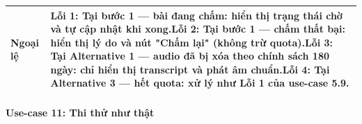 \begin{longtable}{|p{3.2cm}|p{\dimexpr\linewidth-3.2cm-4\tabcolsep-3\arrayrulewidth\relax}|}
\textbf{Ngoại lệ} & \textbf{Lỗi 1:} Tại bước 1 --- bài đang chấm: hiển thị trạng thái chờ và tự cập nhật khi xong.\newline \textbf{Lỗi 2:} Tại bước 1 --- chấm thất bại: hiển thị lý do và nút "Chấm lại" (không trừ quota).\newline \textbf{Lỗi 3:} Tại Alternative 1 --- audio đã bị xóa theo chính sách 180 ngày: chỉ hiển thị transcript và phát âm chuẩn.\newline \textbf{Lỗi 4:} Tại Alternative 3 --- hết quota: xử lý như Lỗi 1 của use-case 5.9. \\ \hline
\end{longtable}
\endgroup


\paragraph{Use-case 11: Thi thử như thật}

